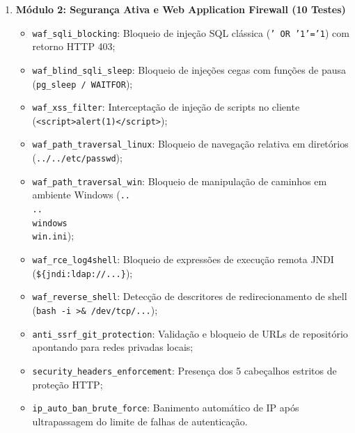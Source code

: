 \begin{enumerate}
    \item \textbf{Módulo 2: Segurança Ativa e Web Application Firewall (10 Testes)}
    \begin{itemize}
        \item \texttt{waf\_sqli\_blocking}: Bloqueio de injeção SQL clássica (\texttt{' OR '1'='1}) com retorno HTTP 403;
        \item \texttt{waf\_blind\_sqli\_sleep}: Bloqueio de injeções cegas com funções de pausa (\texttt{pg\_sleep / WAITFOR});
        \item \texttt{waf\_xss\_filter}: Interceptação de injeção de scripts no cliente (\texttt{<script>alert(1)</script>});
        \item \texttt{waf\_path\_traversal\_linux}: Bloqueio de navegação relativa em diretórios (\texttt{../../etc/passwd});
        \item \texttt{waf\_path\_traversal\_win}: Bloqueio de manipulação de caminhos em ambiente Windows (\texttt{..\\..\\windows\\win.ini});
        \item \texttt{waf\_rce\_log4shell}: Bloqueio de expressões de execução remota JNDI (\texttt{\$\{jndi:ldap://...\}});
        \item \texttt{waf\_reverse\_shell}: Detecção de descritores de redirecionamento de shell (\texttt{bash -i >\& /dev/tcp/...});
        \item \texttt{anti\_ssrf\_git\_protection}: Validação e bloqueio de URLs de repositório apontando para redes privadas locais;
        \item \texttt{security\_headers\_enforcement}: Presença dos 5 cabeçalhos estritos de proteção HTTP;
        \item \texttt{ip\_auto\_ban\_brute\_force}: Banimento automático de IP após ultrapassagem do limite de falhas de autenticação.
    \end{itemize}


\end{enumerate}
